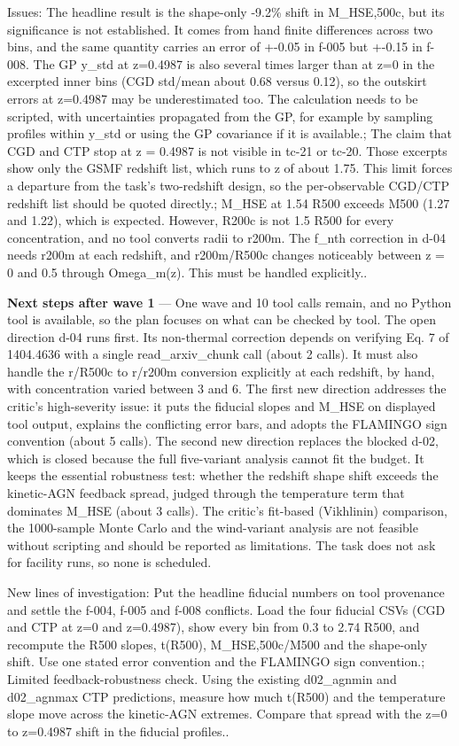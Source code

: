 \documentclass[11pt,a4paper]{article}
\begin{document}
Issues: The headline result is the shape-only -9.2\% shift in M\_HSE,500c, but its significance is not established. It comes from hand finite differences across two bins, and the same quantity carries an error of +-0.05 in f-005 but +-0.15 in f-008. The GP y\_std at z=0.4987 is also several times larger than at z=0 in the excerpted inner bins (CGD std/mean about 0.68 versus 0.12), so the outskirt errors at z=0.4987 may be underestimated too. The calculation needs to be scripted, with uncertainties propagated from the GP, for example by sampling profiles within y\_std or using the GP covariance if it is available.; The claim that CGD and CTP stop at z = 0.4987 is not visible in tc-21 or tc-20. Those excerpts show only the GSMF redshift list, which runs to z of about 1.75. This limit forces a departure from the task's two-redshift design, so the per-observable CGD/CTP redshift list should be quoted directly.; M\_HSE at 1.54 R500 exceeds M500 (1.27 and 1.22), which is expected. However, R200c is not 1.5 R500 for every concentration, and no tool converts radii to r200m. The f\_nth correction in d-04 needs r200m at each redshift, and r200m/R500c changes noticeably between z = 0 and 0.5 through Omega\_m(z). This must be handled explicitly..

\textbf{Next steps after wave 1} --- One wave and 10 tool calls remain, and no Python tool is available, so the plan focuses on what can be checked by tool. The open direction d-04 runs first. Its non-thermal correction depends on verifying Eq. 7 of 1404.4636 with a single read\_arxiv\_chunk call (about 2 calls). It must also handle the r/R500c to r/r200m conversion explicitly at each redshift, by hand, with concentration varied between 3 and 6. The first new direction addresses the critic's high-severity issue: it puts the fiducial slopes and M\_HSE on displayed tool output, explains the conflicting error bars, and adopts the FLAMINGO sign convention (about 5 calls). The second new direction replaces the blocked d-02, which is closed because the full five-variant analysis cannot fit the budget. It keeps the essential robustness test: whether the redshift shape shift exceeds the kinetic-AGN feedback spread, judged through the temperature term that dominates M\_HSE (about 3 calls). The critic's fit-based (Vikhlinin) comparison, the 1000-sample Monte Carlo and the wind-variant analysis are not feasible without scripting and should be reported as limitations. The task does not ask for facility runs, so none is scheduled.

New lines of investigation: Put the headline fiducial numbers on tool provenance and settle the f-004, f-005 and f-008 conflicts. Load the four fiducial CSVs (CGD and CTP at z=0 and z=0.4987), show every bin from 0.3 to 2.74 R500, and recompute the R500 slopes, t(R500), M\_HSE,500c/M500 and the shape-only shift. Use one stated error convention and the FLAMINGO sign convention.; Limited feedback-robustness check. Using the existing d02\_agnmin and d02\_agnmax CTP predictions, measure how much t(R500) and the temperature slope move across the kinetic-AGN extremes. Compare that spread with the z=0 to z=0.4987 shift in the fiducial profiles..
\end{document}
